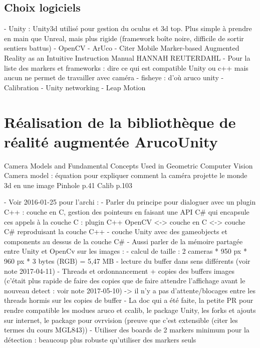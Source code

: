 \subsection{Choix logiciels}
- Unity : Unity3d utilisé pour gestion du oculus et 3d top. Plus simple à prendre en main que Unreal, mais plus rigide (framework boîte noire, difficile de sortir sentiers battus)
- OpenCV
  - ArUco
    - Citer Mobile Marker-based Augmented Reality as an Intuitive Instruction Manual HANNAH REUTERDAHL
    - Pour la liste des markers et frameworks : dire ce qui est compatible Unity ou c++ mais aucun ne permet de travailler avec caméra - fisheye : d'où aruco unity
  - Calibration
- Unity networking
- Leap Motion


\section{Réalisation de la bibliothèque de réalité augmentée ArucoUnity}
Camera Models and Fundamental Concepts Used in Geometric Computer Vision
Camera model : équation pour expliquer comment la caméra projette le monde 3d en une image
Pinhole p.41
Calib p.103

- Voir 2016-01-25 pour l'archi :
  - Parler du principe pour dialoguer avec un plugin C++ : couche en C, gestion des pointeurs en faisant une API C\# qui encapsule ces appels à la couche C : plugin C++ OpenCV <-> couche en C <-> couche C\# reproduisant la couche C++ 
  - couche Unity avec des gameobjects et components au dessus de la couche C\#
- Aussi parler de la mémoire partagée entre Unity et OpenCv sur les images :
  - calcul de taille : 2 cameras * 950 px * 960 px * 3 bytes (RGB) = 5,47 MB
  - lecture du buffer dans sens différents (voir note 2017-04-11)
  - Threads et ordonnancement + copies des buffers images (c'était plus rapide de faire des copies que de faire attendre l'affichage avant le nouveau detect : voir note 2017-05-10) -> il n'y a pas d'attente/blocages entre les threads hormis sur les copies de buffer
- La doc qui a été faite, la petite PR pour rendre compatible les modues aruco et ccalib, le package Unity, les forks et ajouts sur internet, le package pour ovrvision (preuve que c'est extensible (citer les termes du cours MGL843))
- Utiliser des boards de 2 markers minimum pour la détection : beaucoup plus robuste qu'utiliser des markers seuls


